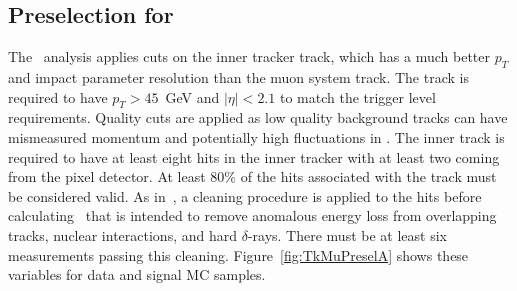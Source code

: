 \subsection{Preselection for \tktof\ \label{sec:tktofpreselection}}

The \tktof\ analysis applies cuts on the inner tracker track, which has a much better $p_T$ and impact parameter resolution than the muon system track.
The track is required to have $p_T > 45$~GeV and  $|\eta| < 2.1$ to match the trigger level requirements. 
Quality cuts are applied as low quality background tracks can have mismeasured momentum and potentially high fluctuations in \dedx.
The inner track is required to have at least eight hits in the inner tracker with at least two coming from the pixel detector. At least 80\% of the hits associated with the track
must be considered valid. As in~\cite{Chatrchyan:2012sp}, a cleaning procedure is applied to the hits before calculating \dedx\ that is 
intended to remove anomalous energy loss from overlapping tracks, nuclear interactions, and hard $\delta$-rays.
There must be at least six measurements passing this cleaning.
Figure~\ref{fig:TkMuPreselA} shows these variables for data and signal MC samples.

